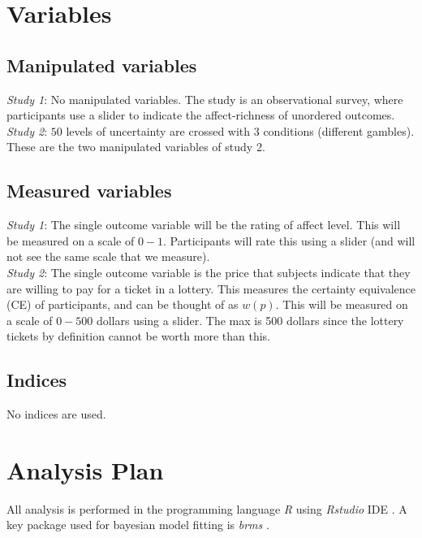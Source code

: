 \documentclass[12pt]{article}
\begin{document}
\section{Variables}

\subsection{Manipulated variables}

\emph{Study 1}: No manipulated variables.
The study is an observational survey, where
participants use a slider to indicate the
affect-richness of unordered outcomes. \\

\emph{Study 2}: $50$ levels of uncertainty are
crossed with  $3$ conditions (different gambles).
These are the two manipulated variables of
study 2.

\subsection{Measured variables}

\emph{Study 1}: The single outcome variable
will be the rating of affect level. This will
be measured on a scale of $0-1$. Participants
will rate this using a slider (and will not see
the same scale that we measure). \\

\emph{Study 2}: The single outcome variable
is the price that subjects indicate that they
are willing to pay for a ticket in a lottery.
This measures the certainty equivalence (CE) of
participants, and can be thought of as $w(p)$.
This will be measured on a scale of $0-500$ dollars
using a slider. The max is 500 dollars since the
lottery tickets by definition cannot be worth
more than this.

\subsection{Indices}

No indices are used.

\section{Analysis Plan}

All analysis is performed in the programming
language \emph{R} \autocite{rcore} using
\emph{Rstudio} IDE
\autocite{rstudio}. A key package used for
bayesian model fitting is \emph{brms}
\autocite{brms}. \\
\end{document}

